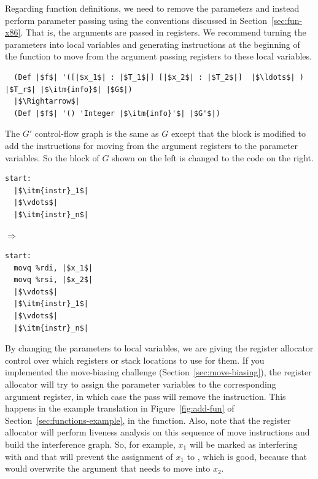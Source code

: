 \documentclass[11pt]{book}
\begin{document}
Regarding function definitions, we need to remove the parameters and
instead perform parameter passing using the conventions discussed in
Section~\ref{sec:fun-x86}. That is, the arguments are passed in
registers. We recommend turning the parameters into local variables
and generating instructions at the beginning of the function to move
from the argument passing registers to these local variables.
\begin{lstlisting}
  (Def |$f$| '([|$x_1$| : |$T_1$|] [|$x_2$| : |$T_2$|]  |$\ldots$| ) |$T_r$| |$\itm{info}$| |$G$|)
  |$\Rightarrow$|
  (Def |$f$| '() 'Integer |$\itm{info}'$| |$G'$|)
\end{lstlisting}
The $G'$ control-flow graph is the same as $G$ except that the
 block is modified to add the instructions for moving from
the argument registers to the parameter variables. So the 
block of $G$ shown on the left is changed to the code on the right.
\begin{center}
\begin{minipage}{0.3\textwidth}
\begin{lstlisting}
start:
  |$\itm{instr}_1$|
  |$\vdots$|
  |$\itm{instr}_n$|
\end{lstlisting}
\end{minipage}
$\Rightarrow$
\begin{minipage}{0.3\textwidth}
\begin{lstlisting}
start:
  movq %rdi, |$x_1$|
  movq %rsi, |$x_2$|
  |$\vdots$|
  |$\itm{instr}_1$|
  |$\vdots$|
  |$\itm{instr}_n$|
\end{lstlisting}
\end{minipage}
\end{center}
By changing the parameters to local variables, we are giving the
register allocator control over which registers or stack locations to
use for them. If you implemented the move-biasing challenge
(Section~\ref{sec:move-biasing}), the register allocator will try to
assign the parameter variables to the corresponding argument register,
in which case the  pass will remove the
 instruction. This happens in the example translation in
Figure~\ref{fig:add-fun} of Section~\ref{sec:functions-example}, in
the  function.
%
Also, note that the register allocator will perform liveness analysis
on this sequence of move instructions and build the interference
graph. So, for example, $x_1$ will be marked as interfering with
 and that will prevent the assignment of $x_1$ to
, which is good, because that would overwrite the argument
that needs to move into $x_2$.
\end{document}
